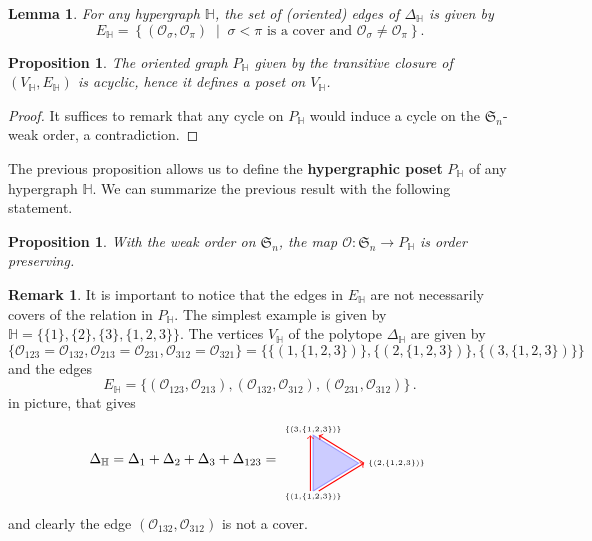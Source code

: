 \documentclass[reqno]{amsart}
\newtheorem{proposition}[theorem]{Proposition}
\newtheorem{lemma}[theorem]{Lemma}
\theoremstyle{definition}
\newtheorem{remark}[theorem]{Remark}
\newcommand{\set}[2]{\left\{ #1 \;\middle|\; #2 \right\}} %
\newcommand{\defn}[1]{\textbf{\textsf{\color{PineGreen} #1}}} %
\newcommand{\fS}{\mathfrak{S}} %
\newcommand{\Or}{\mathcal O}  %
\newcommand{\HH}{\mathbb H}  %
\begin{document}
\begin{lemma}\label{lem:Hedges}
For any hypergraph $\HH$, the set of (oriented) edges of $\Delta_{\HH}$ is given by 
 \[
 E_{\HH} = \set{(\Or_\sigma,\Or_\pi)}{\sigma<\pi \text{ is a cover and } \Or_\sigma\ne\Or_\pi}.
 \]
\end{lemma}

\begin{proposition}\label{prop:PHisOrder}
The oriented graph $P_{\HH}$ given by the transitive closure of $(V_{\HH},E_{\HH})$ is acyclic, hence it defines a poset on $V_{\HH}$.
\end{proposition}

\begin{proof}
It suffices to remark that any cycle on $P_{\HH}$ would induce a cycle on the $\fS_n$-weak order, a contradiction.
\end{proof}

The previous proposition allows us to define the \defn{hypergraphic poset} $P_{\HH}$ of any hypergraph $\HH$.  
We can summarize the previous result with the following statement.

\begin{proposition}\label{prop:WeakToP}
With the weak order on $\fS_n$, the map $\Or \colon \fS_n \to P_{\HH}$ is order preserving.
\end{proposition}

\begin{remark}\label{rem:EdgeNotCover}
It is important to notice that the edges in $E_{\HH}$ are not necessarily covers of the relation in $P_{\HH}$. The simplest example is given by $\HH=\big\{\{1\},\{2\},\{3\},\{1,2,3\}\big\}$.
The vertices $V_{\HH}$ of the polytope $\Delta_{\HH}$ are given by
	$$\Big\{ \Or_{123}=\Or_{132}, \Or_{213}=\Or_{231}, \Or_{312}=\Or_{321}\Big\}= \Big\{ \big\{(1,\{1,2,3\})\big\},\big\{(2,\{1,2,3\})\big\},\big\{(3,\{1,2,3\})\big\}\Big\}$$
and the edges
	$$ E_{\HH}=\big\{ (\Or_{123},\Or_{213}),(\Or_{132},\Or_{312}),(\Or_{231}, \Or_{312})\big\}\,.$$
in picture, that gives
$$\Delta_\HH=\Delta_1+\Delta_2+\Delta_3+\Delta_{123}=
\begin{tikzpicture}[scale=.7,baseline=.0cm]
	\node (a) at (0,-1.2) {$\scriptscriptstyle \{(1,\{1,2,3\})\}$};
	\node (b) at (3,0) {$\scriptscriptstyle \{(2,\{1,2,3\})\}$};
	\node (c) at (0,1.2) {$\scriptscriptstyle \{(3,\{1,2,3\})\}$};
	\draw [color=blue!40,thick,fill=blue!20] (0,-1)--(0,1)--(1.632,0)--(0,-1) ; 
	\draw [color=red,thick,->] (-.1,-1)--(-.1,1); 
	\draw [color=red,thick,->] (1.832,0)--(.2,1); 
	\draw [color=red,thick,->] (.2,-1)--(1.832,0); 
\end{tikzpicture}
$$
and clearly the edge $(\Or_{132},\Or_{312})$ is not a cover. 
\end{remark}
\end{document}

